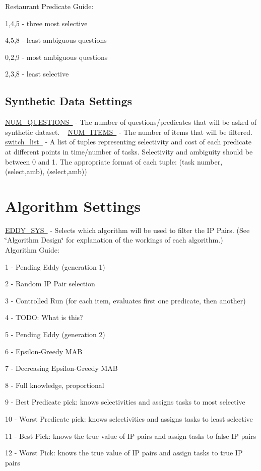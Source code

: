 Restaurant Predicate Guide\+:
\begin{DoxyItemize}
\item 1,4,5 -\/ three most selective
\item 4,5,8 -\/ least ambiguous questions
\item 0,2,9 -\/ most ambiguous questions
\item 2,3,8 -\/ least selective ~\newline
 
\end{DoxyItemize}\hypertarget{toggles_syndata}{}\subsection{Synthetic Data Settings}\label{toggles_syndata}
\mbox{\hyperlink{}{N\+U\+M\+\_\+\+Q\+U\+E\+S\+T\+I\+O\+NS }} -\/ The number of questions/predicates that will be asked of synthetic dataset. ~\newline
 \mbox{\hyperlink{}{N\+U\+M\+\_\+\+I\+T\+E\+MS }} -\/ The number of items that will be filtered. ~\newline
 \mbox{\hyperlink{}{switch\+\_\+list }} -\/ A list of tuples representing selectivity and cost of each predicate at different points in time/number of tasks. Selectivity and ambiguity should be between 0 and 1. The appropriate format of each tuple\+: (task number, (select,amb), (select,amb)) ~\newline
 \hypertarget{toggles_alg}{}\section{Algorithm Settings}\label{toggles_alg}
\mbox{\hyperlink{}{E\+D\+D\+Y\+\_\+\+S\+YS }} -\/ Selects which algorithm will be used to filter the IP Pairs. (See \char`\"{}\+Algorithm Design\char`\"{} for explanation of the workings of each algorithm.) ~\newline
Algorithm Guide\+:
\begin{DoxyItemize}
\item 1 -\/ Pending Eddy (generation 1)
\item 2 -\/ Random IP Pair selection
\item 3 -\/ Controlled Run (for each item, evaluates first one predicate, then another)
\item 4 -\/ T\+O\+DO\+: What is this?
\item 5 -\/ Pending Eddy (generation 2)
\item 6 -\/ Epsilon-\/\+Greedy M\+AB
\item 7 -\/ Decreasing Epsilon-\/\+Greedy M\+AB
\item 8 -\/ Full knowledge, proportional
\item 9 -\/ Best Predicate pick\+: knows selectivities and assigns tasks to most selective
\item 10 -\/ Worst Predicate pick\+: knows selectivities and assigns tasks to least selective
\item 11 -\/ Best Pick\+: knows the true value of IP pairs and assign tasks to false IP pairs
\item 12 -\/ Worst Pick\+: knows the true value of IP pairs and assign tasks to true IP pairs
\end{DoxyItemize}

